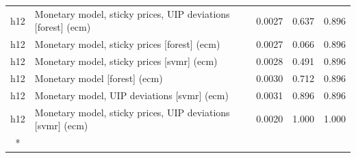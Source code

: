 \begin{ThreePartTable}
\begin{longtable}[t]{cp{5.5cm}ccc}
h12 & \raggedright Monetary model, sticky prices, UIP deviations [forest] (ecm) & 0.0027 & 0.637 & 0.896\\
h12 & \raggedright Monetary model, sticky prices [forest] (ecm) & 0.0027 & 0.066 & 0.896\\
h12 & \raggedright Monetary model, sticky prices [svmr] (ecm) & 0.0028 & 0.491 & 0.896\\
h12 & \raggedright Monetary model [forest] (ecm) & 0.0030 & 0.712 & 0.896\\
h12 & \raggedright Monetary model, UIP deviations [svmr] (ecm) & 0.0031 & 0.896 & 0.896\\
h12 & \raggedright Monetary model, sticky prices, UIP deviations [svmr] (ecm) & 0.0020 & 1.000 & 1.000\\*
\end{longtable}
\end{ThreePartTable}
\endgroup{}
